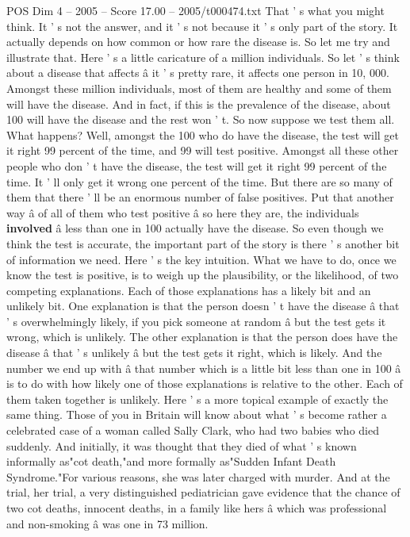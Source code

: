 \begin{textsample}{POS Dim 4 – 2005 – Score 17.00 – 2005/t000474.txt}
That ' s what you might think.
It ' s not the answer, and it ' s not because it ' s only part of the story.
It actually depends on how common or how rare the disease is.
So let me try and illustrate that.
Here ' s a little caricature of a million individuals.
So let ' s think about a disease that affects â it ' s pretty rare, it affects one person in 10, 000.
Amongst these million individuals, most of them are healthy and some of them will have the disease.
And in fact, if this is the prevalence of the disease, about 100 will have the disease and the rest won ' t.
So now suppose we test them all.
What happens?
Well, amongst the 100 who do have the disease, the test will get it right 99 percent of the time, and 99 will test positive.
Amongst all these other people who don ' t have the disease, the test will get it right 99 percent of the time.
It ' ll only get it wrong one percent of the time.
But there are so many of them that there ' ll be an enormous number of false positives.
Put that another way â of all of them who test positive â so here they are, the individuals \textbf{involved} â less than one in 100 actually have the disease.
So even though we think the test is accurate, the important part of the story is there ' s another bit of information we need.
Here ' s the key intuition.
What we have to do, once we know the test is positive, is to weigh up the plausibility, or the likelihood, of two competing explanations.
Each of those explanations has a likely bit and an unlikely bit.
One explanation is that the person doesn ' t have the disease â that ' s overwhelmingly likely, if you pick someone at random â but the test gets it wrong, which is unlikely.
The other explanation is that the person does have the disease â that ' s unlikely â but the test gets it right, which is likely.
And the number we end up with â that number which is a little bit less than one in 100 â is to do with how likely one of those explanations is relative to the other.
Each of them taken together is unlikely.
Here ' s a more topical example of exactly the same thing.
Those of you in Britain will know about what ' s become rather a celebrated case of a woman called Sally Clark, who had two babies who died suddenly.
And initially, it was thought that they died of what ' s known informally as"cot death,"and more formally as"Sudden Infant Death Syndrome."For various reasons, she was later charged with murder.
And at the trial, her trial, a very distinguished pediatrician gave evidence that the chance of two cot deaths, innocent deaths, in a family like hers â which was professional and non-smoking â was one in 73 million.

\end{textsample}
